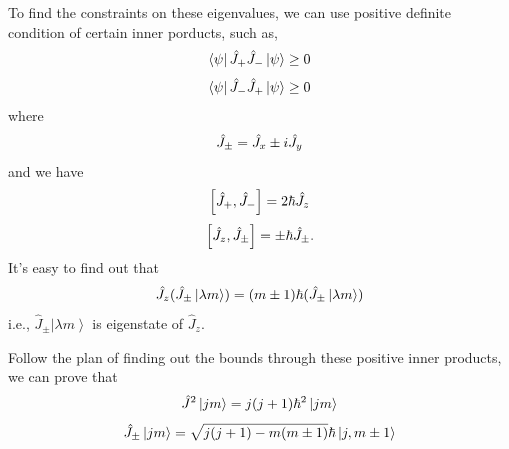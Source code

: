 \documentclass[letterpaper,10pt,english]{sphinxmanual}
\newcommand{\bra}[1]{\left\langle #1\right|}
\newcommand{\ket}[1]{\left| #1\right\rangle}
\begin{document}
To find the constraints on these eigenvalues, we can use positive definite condition of certain inner porducts, such as,
\begin{gather}
\begin{split}\bra{\psi} \hat J_+ \hat J_- \ket{\psi} \geq 0\end{split}\notag
\end{gather}\begin{gather}
\begin{split}\bra{\psi} \hat J_- \hat J_+ \ket{\psi} \geq 0\end{split}\notag
\end{gather}
where
\begin{gather}
\begin{split}\hat J_{\pm} = \hat J_x \pm i \hat J_y\end{split}\notag
\end{gather}
and we have
\begin{gather}
\begin{split}\left[\hat J_+, \hat J_-\right] = 2 \hbar \hat J_z\end{split}\notag
\end{gather}\begin{gather}
\begin{split}\left[\hat J_z, \hat J_{\pm} \right] = \pm \hbar \hat J_{\pm}.\end{split}\notag
\end{gather}
It's easy to find out that
\begin{gather}
\begin{split}\hat J_z (\hat J_{\pm}\ket{\lambda m}) = (m\pm 1) \hbar (\hat J_{\pm} \ket{\lambda m})\end{split}\notag
\end{gather}
i.e., \(\hat J_{\pm}\ket{\lambda m}\) is eigenstate of \(\hat J_z\).

Follow the plan of finding out the bounds through these positive inner products, we can prove that
\begin{gather}
\begin{split}\hat J^2\ket{jm} = j(j+1)\hbar^2 \ket{jm}\end{split}\notag
\end{gather}\begin{gather}
\begin{split}\hat J_{\pm}\ket{jm} = \sqrt{j(j+1)-m(m\pm 1)} \hbar \ket{j,m\pm 1}\end{split}\notag
\end{gather}
\end{document}
